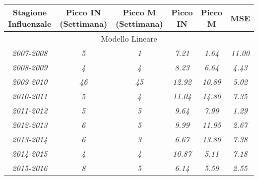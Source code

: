 \begin{table}[p]
\centering
\begin{adjustbox}{max width=\textwidth}
\begin{tabular}{|c|c|c|c|c|c|}
\hline
\rowcolor[HTML]{EFEFEF} 
\textbf{Stagione Influenzale} & \textbf{Picco IN (Settimana)} & \textbf{Picco M (Settimana)} & \textbf{Picco IN} & \textbf{Picco M} & \textbf{MSE}   \\ \hline
\multicolumn{6}{|c|}{\cellcolor[HTML]{EFEFEF}Modello Lineare} \\ \hline
\textit{2007-2008}            & \textit{5}                          & \textit{1}                    & \textit{7.21}           & \textit{1.64}     & \textit{11.00} \\ \hline
\rowcolor[HTML]{FFFFFF} 
\textit{2008-2009}            & \textit{4}                          & \textit{4}                    & \textit{8.23}           & \textit{6.64}     & \textit{4.43}  \\ \hline
\rowcolor[HTML]{FFFFFF} 
\textit{2009-2010}            & \textit{46}                         & \textit{45}                   & \textit{12.92}          & \textit{10.89}    & \textit{5.02}  \\ \hline
\rowcolor[HTML]{FFFFFF} 
\textit{2010-2011}            & \textit{5}                          & \textit{4}                    & \textit{11.04}          & \textit{14.80}    & \textit{7.35}  \\ \hline
\rowcolor[HTML]{FFFFFF} 
\textit{2011-2012}            & \textit{5}                          & \textit{5}                    & \textit{9.64}           & \textit{7.99}     & \textit{1.29}  \\ \hline
\rowcolor[HTML]{FFFFFF} 
\textit{2012-2013}            & \textit{6}                          & \textit{5}                    & \textit{9.99}           & \textit{11.95}    & \textit{2.67}  \\ \hline
\rowcolor[HTML]{FFFFFF} 
\textit{2013-2014}            & \textit{6}                          & \textit{3}                    & \textit{6.67}           & \textit{13.80}    & \textit{7.38}  \\ \hline
\rowcolor[HTML]{FFFFFF} 
\textit{2014-2015}            & \textit{4}                          & \textit{4}                    & \textit{10.87}          & \textit{5.11}     & \textit{7.18}  \\ \hline
\rowcolor[HTML]{FFFFFF} 
\textit{2015-2016}            & \textit{8}                          & \textit{5}                    & \textit{6.14}           & \textit{5.59}     & \textit{2.55}  \\ \hline

\end{tabular}
\end{adjustbox}
\end{table}
